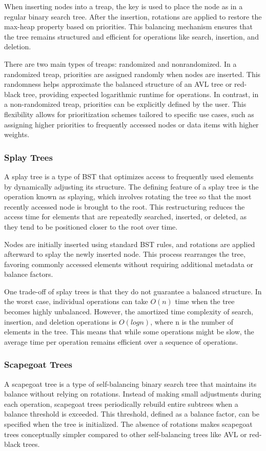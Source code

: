 \documentclass[sigconf]{acmart}
\begin{document}
When inserting nodes into a treap, the key is used to place the node as in a regular binary search tree. After the insertion, rotations are applied to restore the max-heap property based on priorities. This balancing mechanism ensures that the tree remains structured and efficient for operations like search, insertion, and deletion.

There are two main types of treaps: randomized and nonrandomized. In a randomized treap, priorities are assigned randomly when nodes are inserted. This randomness helps approximate the balanced structure of an AVL tree or red-black tree, providing expected logarithmic runtime for operations. In contrast, in a non-randomized treap, priorities can be explicitly defined by the user. This flexibility allows for prioritization schemes tailored to specific use cases, such as assigning higher priorities to frequently accessed nodes or data items with higher weights.

\subsubsection{Splay Trees}
A splay tree\cite{splaytree_ds} is a type of BST that optimizes access to frequently used elements by dynamically adjusting its structure. The defining feature of a splay tree is the operation known as splaying, which involves rotating the tree so that the most recently accessed node is brought to the root. This restructuring reduces the access time for elements that are repeatedly searched, inserted, or deleted, as they tend to be positioned closer to the root over time.

Nodes are initially inserted using standard BST rules, and rotations are applied afterward to splay the newly inserted node. This process rearranges the tree, favoring commonly accessed elements without requiring additional metadata or balance factors.

One trade-off of splay trees is that they do not guarantee a balanced structure. In the worst case, individual operations can take $O(n)$ time when the tree becomes highly unbalanced. However, the amortized time complexity of search, insertion, and deletion operations is $O(logn)$, where n is the number of elements in the tree. This means that while some operations might be slow, the average time per operation remains efficient over a sequence of operations.

\subsubsection{Scapegoat Trees}
A scapegoat tree\cite{scapegoat_ds} is a type of self-balancing binary search tree that maintains its balance without relying on rotations. Instead of making small adjustments during each operation, scapegoat trees periodically rebuild entire subtrees when a balance threshold is exceeded. This threshold, defined as a balance factor, can be specified when the tree is initialized. The absence of rotations makes scapegoat trees conceptually simpler compared to other self-balancing trees like AVL or red-black trees.
\end{document}

